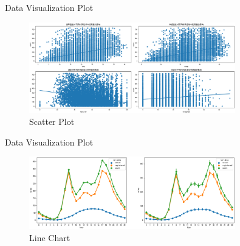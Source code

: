 \documentclass[
size=14pt,
paper=smartboard,  %
mode=present, 		%
display=slides, 	%
style=tuliplab,  	%
pauseslide,
fleqn,leqno]{powerdot}
\begin{document}
	\begin{slide}[toc=,bm=]{Data Visualization Plot}
		\begin{figure}
			\centering
			\includegraphics[width=0.8\textwidth,height=0.5\textwidth]{output.eps}
			\caption{Scatter Plot} \label{framework}
		\end{figure}
	\end{slide}
	
	\begin{slide}[toc=,bm=]{Data Visualization Plot}
		\begin{figure}
			\begin{center}
				\includegraphics[width=0.8\textwidth]{user.eps}
				\caption{Line Chart} \label{framework}
			\end{center}
		\end{figure}
	\end{slide}
	
	
\end{document}
